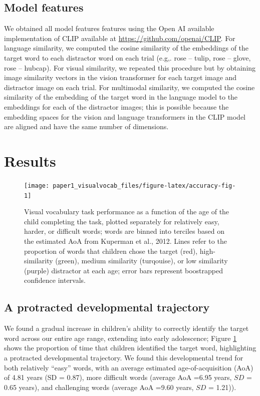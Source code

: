 \documentclass[
  man,floatsintext]{apa6}
\begin{document}
\subsection{Model features}\label{model-features}

We obtained all model features features using the Open AI available implementation of CLIP available at \url{https://github.com/openai/CLIP}. For language similarity, we computed the cosine similarity of the embeddings of the target word to each distractor word on each trial (e.g,. rose -- tulip, rose -- glove, rose -- hubcap). For visual similarity, we repeated this procedure but by obtaining image similarity vectors in the vision transformer for each target image and distractor image on each trial. For multimodal similarity, we computed the cosine similarity of the embedding of the target word in the language model to the embeddings for each of the distractor images; this is possible because the embedding spaces for the vision and language transformers in the CLIP model are aligned and have the same number of dimensions.

\section{Results}\label{results}

\begin{figure}[H]

{\centering \texttt{[image: paper1\_visualvocab\_files/figure-latex/accuracy-fig-1]} 

}

\caption{Visual vocabulary task performance as a function of the age of the child completing the task, plotted separately for relatively easy, harder, or difficult words; words are binned into terciles based on the estimated AoA from Kuperman et al., 2012. Lines refer to the proportion of words that children chose the target (red), high-similarity (green), medium similarity (turqouise), or low similarity (purple) distractor  at each age; error bars represent boostrapped confidence intervals.}\label{fig:accuracy-fig}
\end{figure}

\subsection{A protracted developmental trajectory}\label{a-protracted-developmental-trajectory}

We found a gradual increase in children's ability to correctly identify the target word across our entire age range, extending into early adolescence; Figure \ref{fig:accuracy-fig} shows the proportion of time that children identified the target word, highlighting a protracted developmental trajectory. We found this developmental trend for both relatively ``easy'' words, with an average estimated age-of-acquisition (AoA) of 4.81 years (SD = 0.87), more difficult words (average AoA =6.95 years, \(SD\) = 0.65 years), and challenging words (average AoA =9.60 years, \(SD\) = 1.21)).
\end{document}
